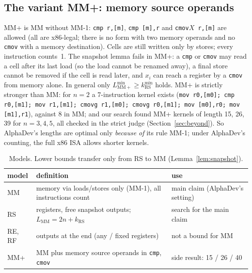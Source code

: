 \subsection{The variant MM+: memory source operands}
MM+ is MM without MM-1: \texttt{cmp r,[m]}, \texttt{cmp [m],r} and \texttt{cmov}$X$\texttt{ r,[m]} are allowed (all are
x86-legal; there is no form with two memory operands and no \texttt{cmov} with a memory destination). Cells are still written
only by stores; every instruction counts~1. The snapshot lemma fails in MM+: a \texttt{cmp} or \texttt{cmov} may read a cell
after its last load (so the load cannot be renamed away), a final store cannot be removed if the cell is read later, and $x_i$
can reach a register by a \texttt{cmov} from memory alone. In general only $L^{\min}_{\mathrm{MM+}} \ge k^{\min}_{\mathrm{RS}}$
holds. MM+ is strictly stronger than MM: for $n = 2$ a 7-instruction kernel exists
(\texttt{mov r0,[m0]; cmp r0,[m1]; mov r1,[m1]; cmovg r1,[m0]; cmovg r0,[m1]; mov [m0],r0; mov [m1],r1}), against 8 in MM;
and our search found MM+ kernels of length 15, 26, 39 for $n = 3, 4, 5$, all checked in the strict judge (Section~\ref{sec:beyond}).
So AlphaDev's lengths are optimal only \emph{because of} its rule MM-1; under AlphaDev's counting, the full x86 ISA allows
shorter kernels.

\begin{table}[h]\centering\small
\begin{tabular}{lp{7.2cm}p{4.6cm}}\toprule
model & definition & use \\\midrule
MM & memory via loads/stores only (MM-1), all instructions count & main claim (AlphaDev's setting) \\
RS & registers, free snapshot outputs; $L_{\mathrm{MM}} = 2n + k_{\mathrm{RS}}$ & search for the main claim \\
RE, RF & outputs at the end (any / fixed registers) & not a bound for MM \\
MM+ & MM plus memory source operands in \texttt{cmp}, \texttt{cmov} & side result: 15 / 26 / 40 \\\bottomrule
\end{tabular}
\caption{Models. Lower bounds transfer only from RS to MM (Lemma~\ref{lem:snapshot}).}
\end{table}
